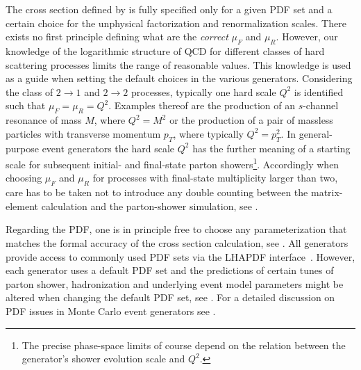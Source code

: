 The cross section defined by  is fully
specified only for a given PDF set and a certain choice for the
unphysical factorization and renormalization scales. There exists no
first principle defining what are the \emph{correct} $\mu_F$ and
$\mu_R$. However, our knowledge of the logarithmic structure of QCD
for different classes of hard scattering processes limits the range
of reasonable values. This knowledge is used as a guide when setting
the default choices in the various generators. Considering the class
of $2\to 1$ and $2\to 2$ processes, typically one hard scale $Q^2$ is
identified such that $\mu_F=\mu_R=Q^2$. Examples thereof are the
production of an $s$-channel resonance of mass $M$, where $Q^2=M^2$ or
the production of a pair of massless particles with transverse
momentum $p_T$, where typically $Q^2=p_T^2$. In general-purpose event
generators the hard scale $Q^2$ has the further meaning of a starting
scale for subsequent initial- and final-state parton showers\footnote{
  The precise phase-space limits of course depend on the relation
  between the generator's shower evolution scale and $Q^2$.}.
Accordingly when choosing $\mu_F$ and $\mu_R$ for processes with
final-state multiplicity larger than two, care has to be taken not to
introduce any double counting between the matrix-element calculation
and the parton-shower simulation, see .

Regarding the PDF, one is in principle free to choose any parameterization
that matches the formal accuracy of the cross section calculation, see 
. All generators provide access to commonly
used PDF sets via the LHAPDF interface~\cite{Whalley:2005nh}. However, each generator
uses a default PDF set and the predictions of certain tunes of parton shower, 
hadronization and underlying event model parameters might be altered when 
changing the default PDF set, see . For a 
detailed discussion on PDF issues in Monte Carlo event generators see 
.

